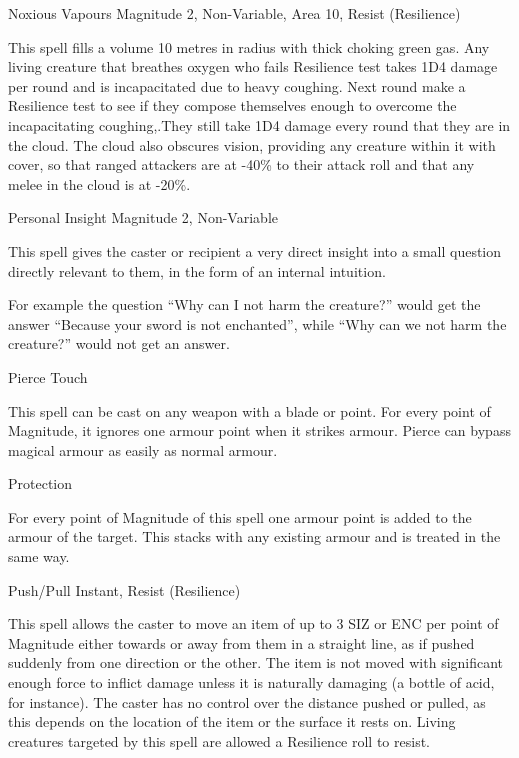 \begin{rpg-spell}
{Noxious Vapours}
{Magnitude 2, Non-Variable, Area 10, Resist (Resilience)}

This spell fills a volume 10 metres in radius with thick choking green gas. Any living creature that breathes oxygen who fails Resilience test takes 1D4 damage per round and is incapacitated due to heavy coughing. Next round make a Resilience test to see if they compose themselves enough to overcome the incapacitating coughing,.They still take 1D4 damage every round that they are in the cloud. The cloud also obscures vision, providing any creature within it with cover, so that ranged attackers are at -40\% to their attack roll and that any melee in the cloud is at -20\%.
\end{rpg-spell}


\begin{rpg-spell}
{Personal Insight}
{Magnitude 2, Non-Variable}

This spell gives the caster or recipient a very direct insight into a small question directly relevant to them, in the form of an internal intuition.

For example the question “Why can I not harm the creature?” would get the answer “Because your sword is not enchanted”, while “Why can we not harm the creature?” would not get an answer.
\end{rpg-spell}


\begin{rpg-spell}
{Pierce}
{Touch}

This spell can be cast on any weapon with a blade or point. For every point of Magnitude, it ignores one armour point when it strikes armour. Pierce can bypass magical armour as easily as normal armour. 
\end{rpg-spell}


\begin{rpg-spell}
{Protection}
{}

For every point of Magnitude of this spell one armour point is added to the armour of the target. This stacks with any existing armour and is treated in the same way. 
\end{rpg-spell}


\begin{rpg-spell}
{Push/Pull}
{Instant, Resist (Resilience)}

This spell allows the caster to move an item of up to 3 SIZ or ENC per point of Magnitude either towards or away from them in a straight line, as if pushed suddenly from one direction or the other. The item is not moved with significant enough force to inflict damage unless it is naturally damaging (a bottle of acid, for instance). The caster has no control over the distance pushed or pulled, as this depends on the location of the item or the surface it rests on. Living creatures targeted by this spell are allowed a Resilience roll to resist.
\end{rpg-spell}


